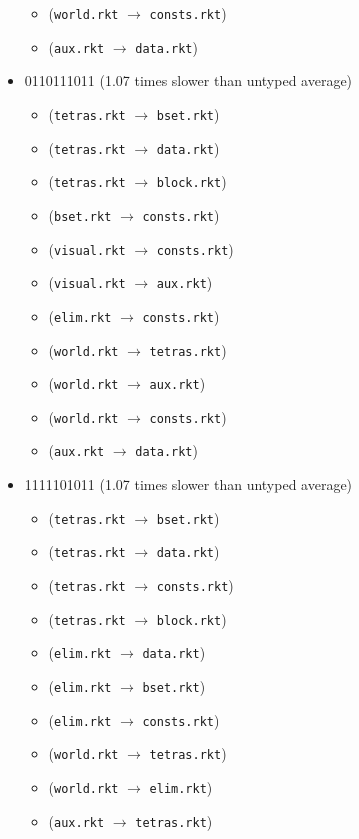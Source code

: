 \documentclass{article}
\newcommand{\mono}[1]{\texttt{#1}}
\begin{document}
\begin{itemize}
\begin{itemize}
  \item (\mono{world.rkt} $\rightarrow$ \mono{consts.rkt})
  \item (\mono{aux.rkt} $\rightarrow$ \mono{data.rkt})
  \end{itemize}
\item 0110111011 (1.07 times slower than untyped average)
  \begin{itemize}
  \item (\mono{tetras.rkt} $\rightarrow$ \mono{bset.rkt})
  \item (\mono{tetras.rkt} $\rightarrow$ \mono{data.rkt})
  \item (\mono{tetras.rkt} $\rightarrow$ \mono{block.rkt})
  \item (\mono{bset.rkt} $\rightarrow$ \mono{consts.rkt})
  \item (\mono{visual.rkt} $\rightarrow$ \mono{consts.rkt})
  \item (\mono{visual.rkt} $\rightarrow$ \mono{aux.rkt})
  \item (\mono{elim.rkt} $\rightarrow$ \mono{consts.rkt})
  \item (\mono{world.rkt} $\rightarrow$ \mono{tetras.rkt})
  \item (\mono{world.rkt} $\rightarrow$ \mono{aux.rkt})
  \item (\mono{world.rkt} $\rightarrow$ \mono{consts.rkt})
  \item (\mono{aux.rkt} $\rightarrow$ \mono{data.rkt})
  \end{itemize}
\item 1111101011 (1.07 times slower than untyped average)
  \begin{itemize}
  \item (\mono{tetras.rkt} $\rightarrow$ \mono{bset.rkt})
  \item (\mono{tetras.rkt} $\rightarrow$ \mono{data.rkt})
  \item (\mono{tetras.rkt} $\rightarrow$ \mono{consts.rkt})
  \item (\mono{tetras.rkt} $\rightarrow$ \mono{block.rkt})
  \item (\mono{elim.rkt} $\rightarrow$ \mono{data.rkt})
  \item (\mono{elim.rkt} $\rightarrow$ \mono{bset.rkt})
  \item (\mono{elim.rkt} $\rightarrow$ \mono{consts.rkt})
  \item (\mono{world.rkt} $\rightarrow$ \mono{tetras.rkt})
  \item (\mono{world.rkt} $\rightarrow$ \mono{elim.rkt})
  \item (\mono{aux.rkt} $\rightarrow$ \mono{tetras.rkt})

\end{itemize}
\end{itemize}
\end{document}
